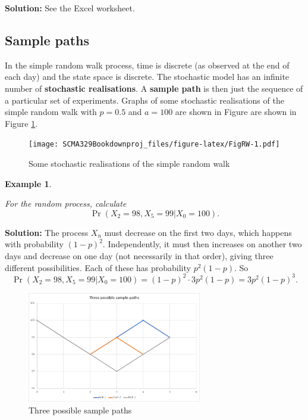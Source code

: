 \documentclass[
]{book}
\theoremstyle{definition}
\theoremstyle{definition}
\newtheorem{example}{Example}[chapter]
\theoremstyle{definition}
\theoremstyle{definition}
\theoremstyle{remark}
\begin{document}
\textbf{Solution:} See the Excel worksheet.

\hypertarget{sample-paths}{%
\subsection{Sample paths}\label{sample-paths}}

In the simple random walk process, time is discrete (as observed at the
end of each day) and the state space is discrete. The stochastic model
has an infinite number of \textbf{stochastic realisations}. A \textbf{sample path}
is then just the sequence of a particular set of experiments. Graphs of
some stochastic realisations of the simple random walk with \(p = 0.5\)
and \(a = 100\) are shown in Figure are shown in Figure \ref{fig:FigRW}.

\begin{figure}
\centering
\texttt{[image: SCMA329Bookdownproj\_files/figure-latex/FigRW-1.pdf]}
\caption{\label{fig:FigRW}Some stochastic realisations of the simple random walk}
\end{figure}

\begin{example}
\protect\hypertarget{exm:unlabeled-div-72}{}\label{exm:unlabeled-div-72}

\emph{For the random process, calculate}
\[\Pr(X_2 = 98, X_5 = 99 | X_0 = 100).\]

\end{example}

\textbf{Solution:} The process \(X_n\) must decrease on the first two days,
which happens with probability \((1-p)^2\). Independently, it must then
increases on another two days and decrease on one day (not necessarily
in that order), giving three different possibilities. Each of these has
probability \(p^2(1-p)\). So
\[\Pr(X_2 = 98, X_5 = 99 | X_0 = 100) = (1-p)^2 \cdot 3 p^2(1-p) = 3p^2(1-p)^3.\]

\begin{figure}
\hypertarget{fig:SamplePaths}{%
\centering
\includegraphics[width=3in,height=\textheight]{RWThreePaths.pdf}
\caption{Three possible sample paths}\label{fig:SamplePaths}
}
\end{figure}
\end{document}
